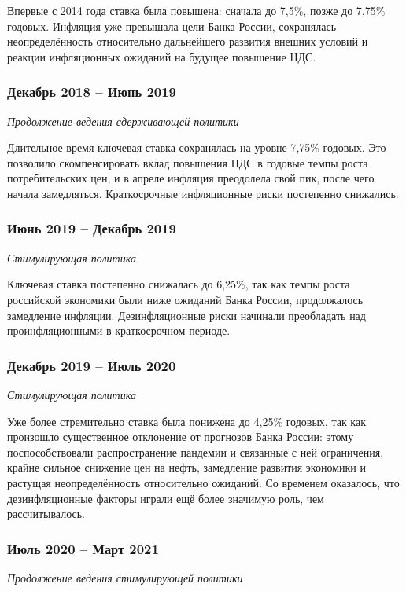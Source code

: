 \noindent
Впервые с 2014 года ставка была повышена: сначала до 7,5\%, позже до 7,75\% годовых. Инфляция уже превышала цели Банка России, сохранялась неопределённость относительно дальнейшего развития внешних условий и реакции инфляционных ожиданий на будущее повышение НДС.

\subsubsection*{Декабрь 2018 – Июнь 2019}
\noindent
\emph{Продолжение ведения сдерживающей политики}

\noindent
Длительное время ключевая ставка сохранялась на уровне 7,75\% годовых. Это позволило скомпенсировать вклад повышения НДС в годовые темпы роста потребительских цен, и в апреле инфляция преодолела свой пик, после чего начала замедляться. Краткосрочные инфляционные риски постепенно снижались.

\subsubsection*{Июнь 2019 – Декабрь 2019}
\noindent
\emph{Стимулирующая политика}

\noindent
Ключевая ставка постепенно снижалась до 6,25\%, так как темпы роста российской экономики были ниже ожиданий Банка России, продолжалось замедление инфляции.  Дезинфляционные риски начинали преобладать над проинфляционными в краткосрочном периоде.

\subsubsection*{Декабрь 2019 – Июль 2020}
\noindent
\emph{Стимулирующая политика}

\noindent
Уже более стремительно ставка была понижена до 4,25\% годовых, так как произошло существенное отклонение от прогнозов Банка России: этому поспособствовали распространение пандемии и связанные с ней ограничения, крайне сильное снижение цен на нефть, замедление развития экономики и растущая неопределённость относительно ожиданий. Со временем оказалось, что дезинфляционные факторы играли ещё более значимую роль, чем рассчитывалось.

\subsubsection*{Июль 2020 – Март 2021}
\noindent
\emph{Продолжение ведения стимулирующей политики}

